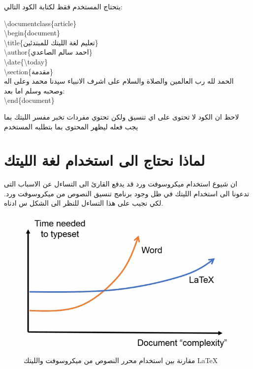 يتحتاج المستخدم فقظ لكتابة الكود التالي:
\begin{english}
\begin{mybox}
\textbackslash documentclass\{article\}\\
\textbackslash begin\{document\}\\
\textbackslash title\{\textarabic{تعليم لغة الليتك للمبتدئين}\}\\
\textbackslash author\{\textarabic{احمد سالم الصاعدي}\}\\
\textbackslash date\{\textbackslash today\}\\
\textbackslash section\{\textarabic{مقدمة}\}\\
\textarabic{
الحمد لله رب العالمين والصلاة والسلام على اشرف الانبياء سيدنا محمد وعلى اله وصحبه وسلم اما بعد:
}\\
\textbackslash end\{document\}
\end{mybox}
\end{english}
لاحظ ان الكود لا تحتوى على اي تنسيق ولكن تحتوي مفردات تخبر مفسر الليتك بما يجب فعله ليظهر المحتوى بما بتطلبه المستخدم
\section{لماذا نحتاج الى استخدام لغة الليتك}

ان شيوع استخدام ميكروسوفت ورد قد يدفع القارئ الى التساءل عن الاسباب التى تدعونا الى استخدام الليتك في ظل وجود برنامج تنسيق النصوص من ميكروسوفت ورد. لكي نجيب على هذا التساءل للنظر الى الشكل س ادناه. \\ 
\begin{mybox}
	\begin{figure}[H]
		\includegraphics[width=\linewidth]{figures/mswvslatex.png}
		\caption{مقارنة بين استخدام محرر النصوص من ميكروسوفت والليتك \LaTeX}
		\label{fig:startpython}
	\end{figure}
\end{mybox}

